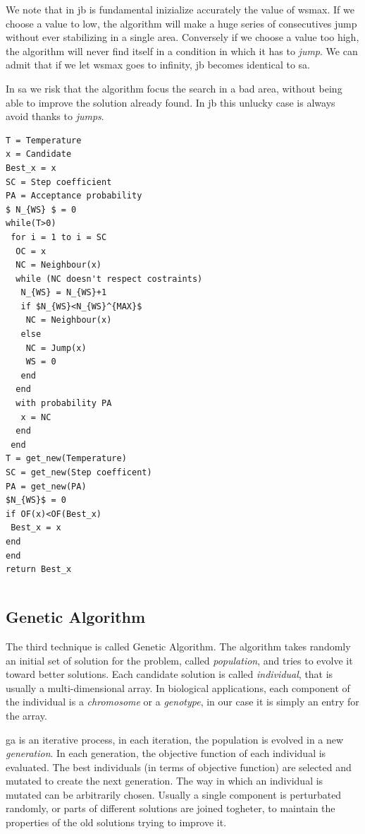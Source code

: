 \documentclass[journal]{IEEEtran}
\begin{document}
We note that in \gls{jb} is fundamental inizialize accurately the value of \gls{wsmax}. If we choose a value to low, the algorithm will make a huge series of consecutives jump without ever stabilizing in a single area. Conversely if we choose a value too high, the algorithm will never find itself in a condition in which it has to \textit{jump}. We can admit that if we let \gls{wsmax} goes to infinity, \gls{jb} becomes identical to \gls{sa}.

In \gls{sa} we risk that the algorithm focus the search in a bad area, without being able to improve the solution already found. In \gls{jb} this unlucky case is always avoid thanks to \textit{jumps}. 


\pagebreak

\begin{lstlisting}[mathescape=true,frame=single]
T = Temperature
x = Candidate
Best_x = x
SC = Step coefficient
PA = Acceptance probability
$ N_{WS} $ = 0
while(T>0)
 for i = 1 to i = SC
  OC = x
  NC = Neighbour(x)
  while (NC doesn't respect costraints)
   N_{WS} = N_{WS}+1
   if $N_{WS}<N_{WS}^{MAX}$
    NC = Neighbour(x)
   else
    NC = Jump(x)
    WS = 0
   end
  end
  with probability PA
   x = NC
  end
 end
T = get_new(Temperature)
SC = get_new(Step coefficent)
PA = get_new(PA)
$N_{WS}$ = 0
if OF(x)<OF(Best_x)
 Best_x = x
end
end
return Best_x
\end{lstlisting} 

\pagebreak

\begin{lstlisting}[frame=single]
\end{lstlisting} 


\subsection{Genetic Algorithm}
The third technique is called Genetic Algorithm.
The algorithm takes randomly an initial set of solution for the problem, called \textit{population}, and tries to evolve it toward better solutions.
Each candidate solution is called \textit{individual}, that is usually a multi-dimensional array. In biological applications, each component of the individual is a \textit{chromosome} or a \textit{genotype}, in our case it is simply an entry for the array.

\gls{ga} is an iterative process, in each iteration, the population is evolved in a new \textit{generation}.
In each generation, the objective function of each individual is evaluated. The best individuals (in terms of objective function) are selected and mutated to create the next generation.
The way in which an individual is mutated can be arbitrarily chosen.
Usually a single component is perturbated randomly, or parts of different solutions are joined togheter, to maintain the properties of the old solutions trying to improve it.
\end{document}
